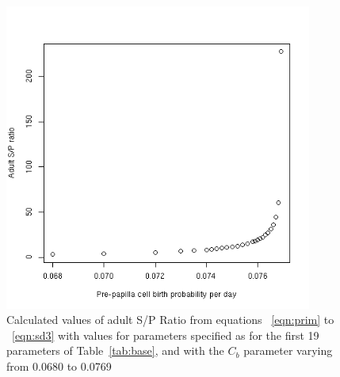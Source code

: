 %

\begin{figure}[!h]
  \centering
   \includegraphics[width=0.9\textwidth]{cbprobsop.png}
  \caption{Calculated values of adult S/P Ratio from equations ~\ref{eqn:prim} to ~\ref{eqn:sd3} with values for parameters specified as for the first 19 parameters of Table~\ref{tab:base}, and with the $C_{b}$ parameter varying from 0.0680 to 0.0769}
  \label{fig:cbprobsop}
\end{figure}

%

